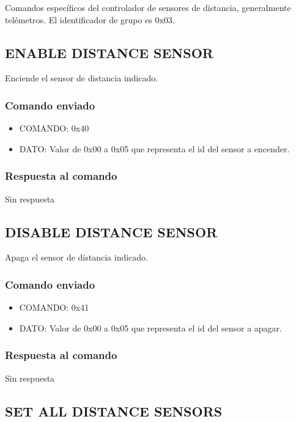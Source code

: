 \documentclass[a4paper,10pt]{article}
\begin{document}
Comandos espec\'ificos del controlador de sensores de distancia, generalmente tel\'emetros.
El identificador de grupo es 0x03.

\subsection{ENABLE DISTANCE SENSOR}
\label{enable_distance_sensor}

Enciende el sensor de distancia indicado.

\subsubsection*{Comando enviado}

\begin{itemize}
	\item{COMANDO:} 0x40
	\item{DATO:} Valor de 0x00 a 0x05 que representa el id del sensor a encender.
\end{itemize}

\subsubsection*{Respuesta al comando}

Sin respuesta

\subsection{DISABLE DISTANCE SENSOR}
\label{disable_distance_sensor}

Apaga el sensor de distancia indicado.

\subsubsection*{Comando enviado}

\begin{itemize}
	\item{COMANDO:} 0x41
	\item{DATO:} Valor de 0x00 a 0x05 que representa el id del sensor a apagar.
\end{itemize}

\subsubsection*{Respuesta al comando}

Sin respuesta

\subsection{SET ALL DISTANCE SENSORS}
\label{set_all_distance_sensors}
\end{document}
